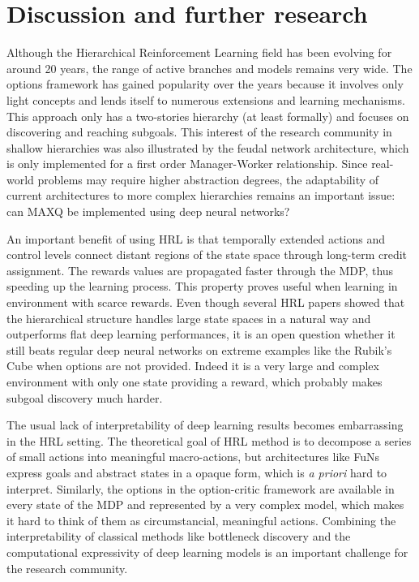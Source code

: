 \documentclass{article}
\begin{document}
\section{Discussion and further research}

Although the Hierarchical Reinforcement Learning field has been evolving for around 20 years, the range of active branches and models remains very wide. The options framework has gained popularity over the years because it involves only light concepts and lends itself to numerous extensions and learning mechanisms. This approach only has a two-stories hierarchy (at least formally) and focuses on discovering and reaching subgoals. This interest of the research community in shallow hierarchies was also illustrated by the feudal network architecture, which is only implemented for a first order Manager-Worker relationship. Since real-world problems may require higher abstraction degrees, the adaptability of current architectures to more complex hierarchies remains an important issue: can MAXQ be implemented using deep neural networks?

An important benefit of using HRL is that temporally extended actions and control levels connect distant regions of the state space through long-term credit assignment. The rewards values are propagated faster through the MDP, thus speeding up the learning process. This property proves useful when learning in environment with scarce rewards. Even though several HRL papers showed that the hierarchical structure handles large state spaces in a natural way and outperforms flat deep learning performances, it is an open question whether it still beats regular deep neural networks on extreme examples like the Rubik's Cube when options are not provided. Indeed it is a very large and complex environment with only one state providing a reward, which probably makes subgoal discovery much harder.

The usual lack of interpretability of deep learning results becomes embarrassing in the HRL setting. The theoretical goal of HRL method is to decompose a series of small actions into meaningful macro-actions, but architectures like FuNs express goals and abstract states in a opaque form, which is \textit{a priori} hard to interpret. Similarly, the options in the option-critic framework are available in every state of the MDP and represented by a very complex model, which makes it hard to think of them as circumstancial, meaningful actions. Combining the interpretability of classical methods like bottleneck discovery and the computational expressivity of deep learning models is an important challenge for the research community.
\end{document}
